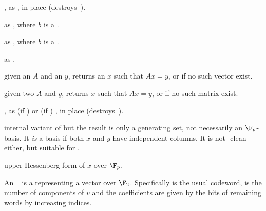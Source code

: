 

, as , in place
(destroys~).

 as , where $b$ is a
.

 as , where $b$ is
a .



 as .

 given an 
$A$ and an  $y$, returns an $x$ such that $Ax = y$, or 
if no such vector exist.

given two  $A$ and $y$, returns $x$ such that $Ax = y$, or 
if no such matrix exist.


, as  (if
) or  (if ) , in place
(destroys~).





 internal variant of
 but the result is only a generating set, not
necessarily an $\F_p$-basis. It \emph{is} a basis if both $x$ and $y$
have independent columns. It is not -clean either, but
suitable for .


 upper Hessenberg form of $x$ over $\F_p$.

  An ~ is a
 representing a vector over $\F_2$. Specifically  is
the usual codeword,  is the number of components of $v$ and the
coefficients are given by the bits of remaining words by increasing indices.


